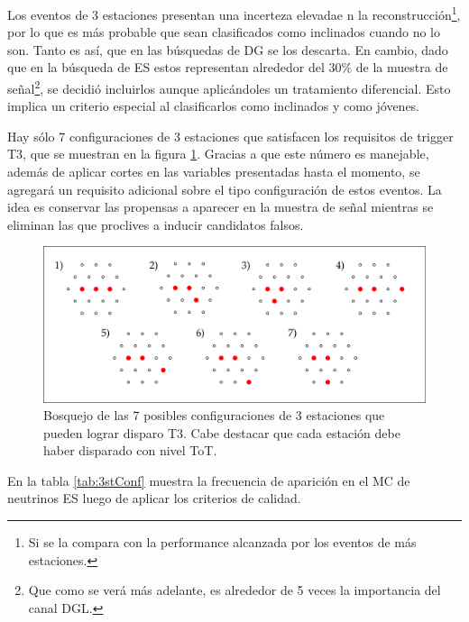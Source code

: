 		Los eventos de 3 estaciones presentan una incerteza elevadae n la reconstrucción\footnote{Si se la compara con la performance alcanzada por los eventos de más estaciones.}, por lo que es más probable que sean clasificados como inclinados cuando no lo son.
		Tanto es así, que en las búsquedas de DG se los descarta.
		En cambio, dado que en la búsqueda de ES estos representan alrededor del 30$\%$ de la muestra de señal\footnote{Que como se ver\'a m\'as adelante, es alrededor de 5 veces la importancia del canal DGL.}, se decidi\'o incluirlos aunque aplic\'andoles un tratamiento diferencial.
		Esto implica un criterio especial al clasificarlos como inclinados y como jóvenes.
		
		Hay sólo 7 configuraciones de 3 estaciones que satisfacen los requisitos de trigger T3, que se muestran en la figura \ref{fig:3stConf}.
		Gracias a que este número es manejable, además de aplicar cortes en las variables presentadas hasta el momento, se agregará un requisito adicional sobre el tipo configuración de estos eventos.
		La idea es conservar las propensas a aparecer en la muestra de señal mientras se eliminan las que proclives a inducir candidatos falsos.
		\begin{figure}[ht!]
		\begin{center}
		\includegraphics[width=1.0\textwidth]{fig/seleccionAuger/3stConf}
		\caption{Bosquejo de las 7 posibles configuraciones de 3 estaciones que pueden lograr disparo T3. Cabe destacar que cada estación debe haber disparado con nivel ToT.}
		\label{fig:3stConf}
		\end{center}
		\end{figure}
		En la tabla \ref{tab:3stConf} muestra la frecuencia de aparición en el MC de neutrinos ES luego de aplicar los criterios de calidad.
